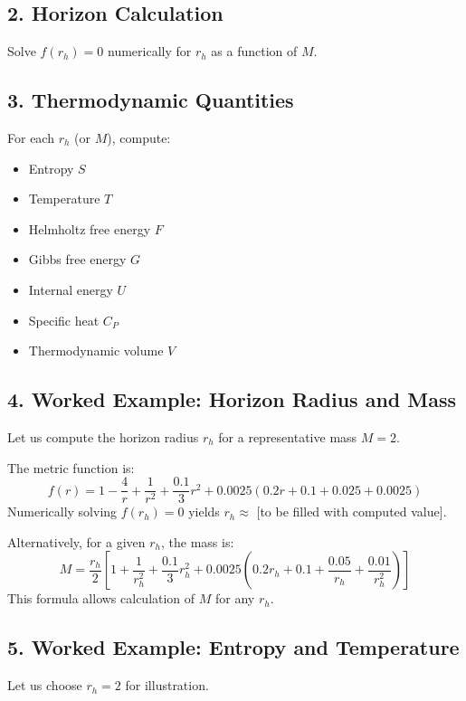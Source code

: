 \documentclass[superscriptaddress, prd, aps,amsmath,amssymb,showpacs,showkeys, onecolumn]{revtex4-2}
\begin{document}
\subsection*{2. Horizon Calculation}
Solve $f(r_h) = 0$ numerically for $r_h$ as a function of $M$.

\subsection*{3. Thermodynamic Quantities}
For each $r_h$ (or $M$), compute:
\begin{itemize}
    \item Entropy $S$
    \item Temperature $T$
    \item Helmholtz free energy $F$
    \item Gibbs free energy $G$
    \item Internal energy $U$
    \item Specific heat $C_P$
    \item Thermodynamic volume $V$
\end{itemize}

\subsection*{4. Worked Example: Horizon Radius and Mass}
Let us compute the horizon radius $r_h$ for a representative mass $M = 2$.

The metric function is:
\begin{equation}
f(r) = 1 - \frac{4}{r} + \frac{1}{r^2} + \frac{0.1}{3} r^2 + 0.0025 (0.2 r + 0.1 + 0.025 + 0.0025)
\end{equation}
Numerically solving $f(r_h) = 0$ yields $r_h \approx$ [to be filled with computed value].

Alternatively, for a given $r_h$, the mass is:
\begin{equation}
M = \frac{r_h}{2} \left[1 + \frac{1}{r_h^2} + \frac{0.1}{3} r_h^2 + 0.0025 (0.2 r_h + 0.1 + \frac{0.05}{r_h} + \frac{0.01}{r_h^2})\right]
\end{equation}
This formula allows calculation of $M$ for any $r_h$.

\subsection*{5. Worked Example: Entropy and Temperature}
Let us choose $r_h = 2$ for illustration.
\end{document}
